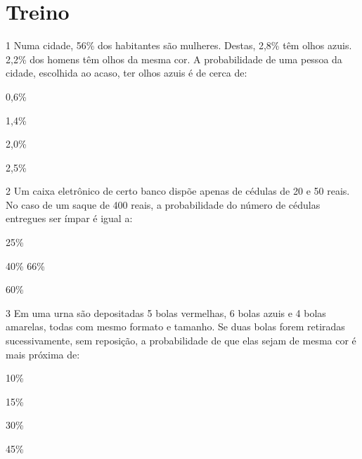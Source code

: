 \begin{emptybox}
\end{emptybox}

\pagebreak
\section{Treino}

\num{1} Numa cidade, 56\% dos habitantes são mulheres. Destas, 2,8\% têm olhos
azuis. 2,2\% dos homens têm olhos da mesma cor. A probabilidade de uma pessoa 
da cidade, escolhida ao acaso, ter olhos azuis é de cerca de:

\begin{escolha}

  \item 0,6\%

  \item 1,4\%

  \item 2,0\%

  \item 2,5\%

\end{escolha}


\num{2} Um caixa eletrônico de certo banco dispõe apenas de cédulas de 20 e 50
reais. No caso de um saque de 400 reais, a probabilidade do número de
cédulas entregues ser ímpar é igual a:

\begin{escolha}

  \item 25\%

  \item 40\%
66\%

  \item 60\%

\end{escolha}


\num{3} Em uma urna são depositadas 5 bolas vermelhas, 6 bolas azuis e 4 bolas
amarelas, todas com mesmo formato e tamanho. Se duas bolas forem
retiradas sucessivamente, sem reposição, a probabilidade de que elas
sejam de mesma cor é mais próxima de:

\begin{escolha}

  \item 10\%

  \item 15\%

  \item 30\%

  \item 45\%

\end{escolha}






